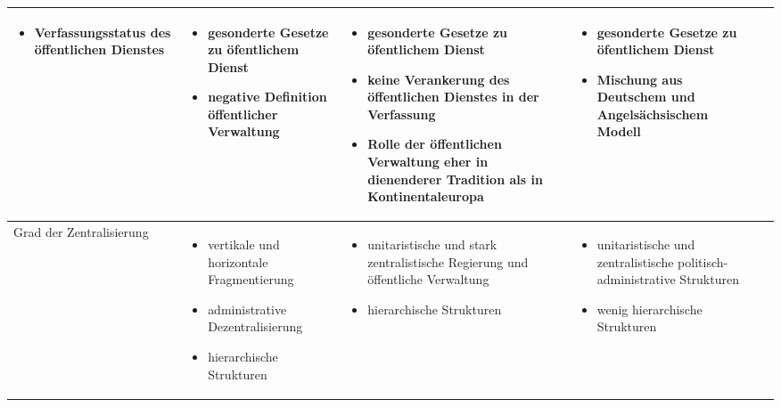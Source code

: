 \begin{landscape}
\begin{scriptsize}
\begin{longtable}[H]{|L{4cm}|L{5cm}|L{5cm}|L{5cm}|L{5cm}|}
\begin{itemize}
\item Verfassungsstatus des öffentlichen Dienstes
\end{itemize}
&
\begin{itemize}
\item gesonderte Gesetze zu öfentlichem Dienst            
\item negative Definition öffentlicher Verwaltung 
\end{itemize}
&
 \vspace{-2mm}
\begin{itemize}
\item gesonderte Gesetze zu öfentlichem Dienst
\item keine Verankerung des öffentlichen Dienstes in der Verfassung
\item Rolle der öffentlichen Verwaltung eher in dienenderer Tradition als in Kontinentaleuropa
 \end{itemize}
\vspace{-3mm}
&
\begin{itemize}
\item gesonderte Gesetze zu öfentlichem Dienst            
\item Mischung aus Deutschem und Angelsächsischem Modell
\end{itemize}\\\hline
Grad der Zentralisierung&
 \vspace{-2mm}
\begin{itemize}
\item vertikale und horizontale Fragmentierung
\item administrative Dezentralisierung
\item hierarchische Strukturen
\end{itemize}
 \vspace{-2mm}
&
\vspace{-1mm}
\begin{itemize}
\item unitaristische und stark zentralistische Regierung und öffentliche Verwaltung
\item hierarchische Strukturen
\end{itemize}
\vspace{-1mm}
 &
\vspace{-1mm}
\begin{itemize}
\item unitaristische und zentralistische politisch-administrative Strukturen
\item wenig hierarchische Strukturen 	
\end{itemize}

\end{longtable}
\end{scriptsize}
\end{landscape}
